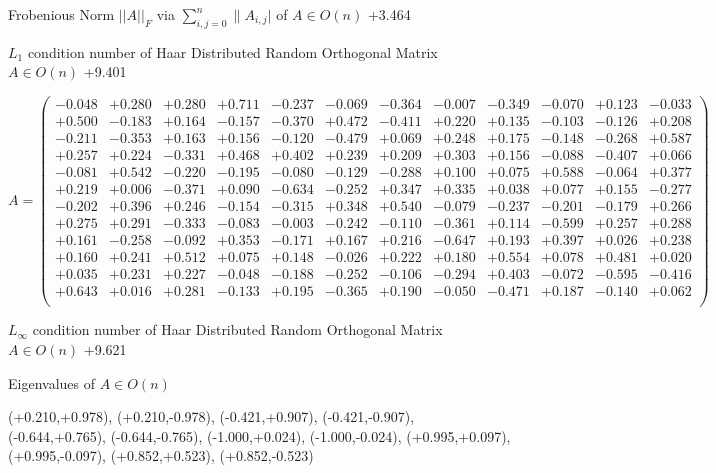 \documentclass[9pt]{article}
\theoremstyle{plain}
\theoremstyle{definition}
\theoremstyle{remark}
\numberwithin{equation}{section}
\begin{document}
Frobenious Norm  $||A||_{\textit{F}}$ via $\sum\limits_{i,j =0}^{n} \|A_{i,j}|$   of  $A \in O(n)$  +3.464

$L_1$ condition number of Haar Distributed Random Orthogonal Matrix $A \in O(n)$ +9.401

$A = \left(
\begin{array}{
cccccccccccc}
-0.048 & +0.280 & +0.280 & +0.711 & -0.237 & -0.069 & -0.364 & -0.007 & -0.349 & -0.070 & +0.123 & -0.033 \\
+0.500 & -0.183 & +0.164 & -0.157 & -0.370 & +0.472 & -0.411 & +0.220 & +0.135 & -0.103 & -0.126 & +0.208 \\
-0.211 & -0.353 & +0.163 & +0.156 & -0.120 & -0.479 & +0.069 & +0.248 & +0.175 & -0.148 & -0.268 & +0.587 \\
+0.257 & +0.224 & -0.331 & +0.468 & +0.402 & +0.239 & +0.209 & +0.303 & +0.156 & -0.088 & -0.407 & +0.066 \\
-0.081 & +0.542 & -0.220 & -0.195 & -0.080 & -0.129 & -0.288 & +0.100 & +0.075 & +0.588 & -0.064 & +0.377 \\
+0.219 & +0.006 & -0.371 & +0.090 & -0.634 & -0.252 & +0.347 & +0.335 & +0.038 & +0.077 & +0.155 & -0.277 \\
-0.202 & +0.396 & +0.246 & -0.154 & -0.315 & +0.348 & +0.540 & -0.079 & -0.237 & -0.201 & -0.179 & +0.266 \\
+0.275 & +0.291 & -0.333 & -0.083 & -0.003 & -0.242 & -0.110 & -0.361 & +0.114 & -0.599 & +0.257 & +0.288 \\
+0.161 & -0.258 & -0.092 & +0.353 & -0.171 & +0.167 & +0.216 & -0.647 & +0.193 & +0.397 & +0.026 & +0.238 \\
+0.160 & +0.241 & +0.512 & +0.075 & +0.148 & -0.026 & +0.222 & +0.180 & +0.554 & +0.078 & +0.481 & +0.020 \\
+0.035 & +0.231 & +0.227 & -0.048 & -0.188 & -0.252 & -0.106 & -0.294 & +0.403 & -0.072 & -0.595 & -0.416 \\
+0.643 & +0.016 & +0.281 & -0.133 & +0.195 & -0.365 & +0.190 & -0.050 & -0.471 & +0.187 & -0.140 & +0.062 \\
\end{array}
\right)$ \newline 

$L_{\infty}$ condition number of Haar Distributed Random Orthogonal Matrix $A \in O(n)$ +9.621

Eigenvalues of $A \in O(n)$

(+0.210,+0.978), (+0.210,-0.978), (-0.421,+0.907), (-0.421,-0.907), (-0.644,+0.765), (-0.644,-0.765), (-1.000,+0.024), (-1.000,-0.024), (+0.995,+0.097), (+0.995,-0.097), (+0.852,+0.523), (+0.852,-0.523)
\end{document}
